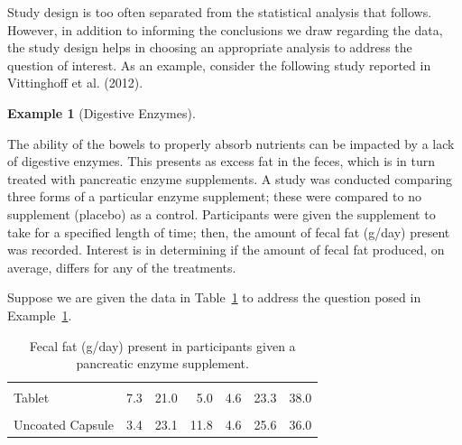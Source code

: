 \documentclass[
  letterpaper,
  DIV=11,
  numbers=noendperiod]{scrreprt}
\theoremstyle{definition}
\theoremstyle{definition}
\newtheorem{example}{Example}[chapter]
\theoremstyle{remark}
\begin{document}
Study design is too often separated from the statistical analysis that
follows. However, in addition to informing the conclusions we draw
regarding the data, the study design helps in choosing an appropriate
analysis to address the question of interest. As an example, consider
the following study reported in Vittinghoff et al. (2012).

\begin{example}[Digestive
Enzymes]\protect\hypertarget{exm-rm-enzyme}{}\label{exm-rm-enzyme}

The ability of the bowels to properly absorb nutrients can be impacted
by a lack of digestive enzymes. This presents as excess fat in the
feces, which is in turn treated with pancreatic enzyme supplements. A
study was conducted comparing three forms of a particular enzyme
supplement; these were compared to no supplement (placebo) as a control.
Participants were given the supplement to take for a specified length of
time; then, the amount of fecal fat (g/day) present was recorded.
Interest is in determining if the amount of fecal fat produced, on
average, differs for any of the treatments.

\end{example}

Suppose we are given the data in Table~\ref{tbl-rm-enzyme-data-table} to
address the question posed in Example~\ref{exm-rm-enzyme}.

\hypertarget{tbl-rm-enzyme-data-table}{}
\begin{table}
\caption{\label{tbl-rm-enzyme-data-table}Fecal fat (g/day) present in participants given a pancreatic enzyme
supplement. }\tabularnewline

\centering
\begin{tabular}[t]{lrrrrrr}
\toprule
\cellcolor{gray!10}{Placebo} & \cellcolor{gray!10}{44.5} & \cellcolor{gray!10}{33.0} & \cellcolor{gray!10}{19.1} & \cellcolor{gray!10}{9.4} & \cellcolor{gray!10}{71.3} & \cellcolor{gray!10}{51.2}\\
Tablet & 7.3 & 21.0 & 5.0 & 4.6 & 23.3 & 38.0\\
\cellcolor{gray!10}{Coated Capsule} & \cellcolor{gray!10}{12.4} & \cellcolor{gray!10}{25.6} & \cellcolor{gray!10}{22.0} & \cellcolor{gray!10}{5.8} & \cellcolor{gray!10}{68.2} & \cellcolor{gray!10}{52.6}\\
Uncoated Capsule & 3.4 & 23.1 & 11.8 & 4.6 & 25.6 & 36.0\\
\bottomrule
\end{tabular}
\end{table}
\end{document}
